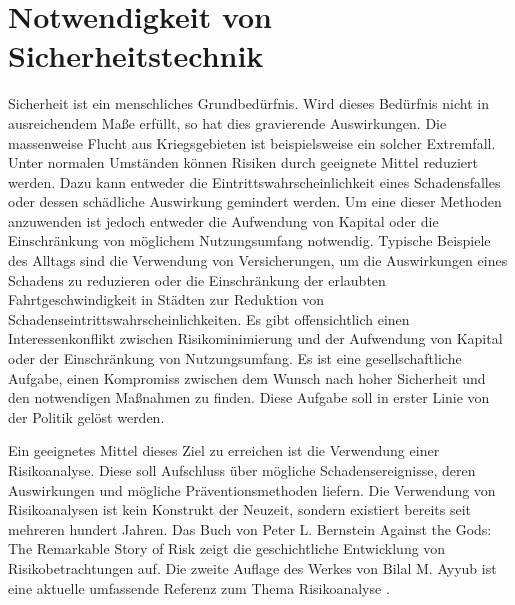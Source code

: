 \section{Notwendigkeit von Sicherheitstechnik} \label{sec:einltg_sicherheitstechnik}
Sicherheit ist ein menschliches Grundbed\"urfnis. Wird dieses Bed\"urfnis nicht in ausreichendem Ma\ss{}e erf\"ullt, so hat dies gravierende Auswirkungen. Die massenweise Flucht aus Kriegsgebieten ist beispielsweise ein solcher Extremfall. \newline
Unter normalen Umst\"anden k\"onnen Risiken durch geeignete Mittel reduziert werden. Dazu kann entweder die Eintrittswahrscheinlichkeit eines Schadensfalles oder dessen sch\"adliche Auswirkung gemindert werden. Um eine dieser Methoden anzuwenden ist jedoch entweder die Aufwendung von Kapital oder die Einschr\"ankung von m\"oglichem Nutzungsumfang notwendig. Typische Beispiele des Alltags sind die Verwendung von Versicherungen, um die Auswirkungen eines Schadens zu reduzieren oder die Einschr\"ankung der erlaubten Fahrtgeschwindigkeit in St\"adten zur Reduktion von Schadenseintrittswahrscheinlichkeiten. Es gibt offensichtlich einen Interessenkonflikt zwischen Risikominimierung und der Aufwendung von Kapital oder der Einschr\"ankung von Nutzungsumfang. \newline
Es ist eine gesellschaftliche Aufgabe, einen Kompromiss zwischen dem Wunsch nach hoher Sicherheit und den notwendigen Ma\ss{}nahmen zu finden. Diese Aufgabe soll in erster Linie von der Politik gel\"ost werden.

Ein geeignetes Mittel dieses Ziel zu erreichen ist die Verwendung einer Risikoanalyse. Diese soll Aufschluss \"uber m\"ogliche Schadensereignisse, deren Auswirkungen und m\"ogliche Pr\"aventionsmethoden liefern. Die Verwendung von Risikoanalysen ist kein Konstrukt der Neuzeit, sondern existiert bereits seit mehreren hundert Jahren. Das Buch von Peter L. Bernstein \glqq Against the Gods: The Remarkable Story of Risk\grqq { }\cite{Bernstein_1998} zeigt die geschichtliche Entwicklung von Risikobetrachtungen auf. Die zweite Auflage des Werkes von Bilal M. Ayyub ist eine aktuelle umfassende Referenz zum Thema Risikoanalyse \cite{Ayyub_2014}.

